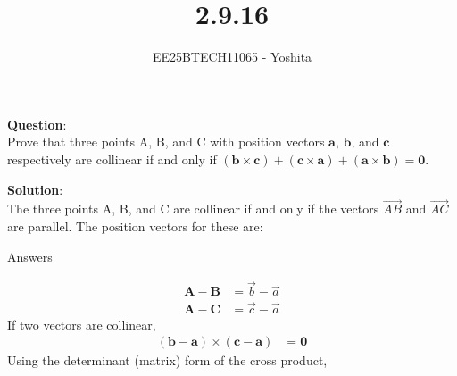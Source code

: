 \documentclass[journal]{IEEEtran}
\begin{document}

\vspace{3cm}

\title{2.9.16}
\author{EE25BTECH11065 - Yoshita}
{\let\newpage\relax\maketitle}

\renewcommand{\thefigure}{\theenumi}
\renewcommand{\thetable}{\theenumi}
\setlength{\intextsep}{10pt} %

\textbf{Question}:\\
Prove that three points A, B, and C with position vectors $\mathbf{a}$, $\mathbf{b}$, and $\mathbf{c}$ respectively are collinear if and only if $(\mathbf{b} \times \mathbf{c}) + (\mathbf{c} \times \mathbf{a}) + (\mathbf{a} \times \mathbf{b}) = \mathbf{0}$.\\
\bigskip

\textbf{Solution}:\\
The three points A, B, and C are collinear if and only if the vectors $\vec{AB}$ and $\vec{AC}$ are parallel. The position vectors for these are:
\begin{table}[H]    
  \centering
  
  \caption{Answers}
  \label{Answers}
\end{table}
\begin{align*}
    \mathbf{A-B} &= \vec{b} - \vec{a} \\
    \mathbf{A-C} &= \vec{c} - \vec{a}
\end{align*}
If two vectors are collinear,
\begin{align}
    (\mathbf{b} - \mathbf{a}) \times (\mathbf{c} - \mathbf{a}) &= \mathbf{0}
\end{align}
Using the determinant (matrix) form of the cross product,
\end{document}
